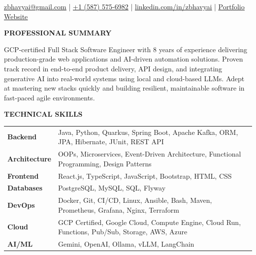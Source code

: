\documentclass[a4paper]{article}
\newcommand{\header} [1] {
    \vspace{6pt}
    {\hspace*{-18pt} \textcolor{Accent}{\large\textbf{\MakeUppercase{#1}}}}
    \vspace{-7pt} \\
    {\color{Accent}\hspace*{-18pt} \hrulefill \hspace*{-7pt}}
}
\begin{document}
\begin{center}
   {}
\end{center}
\vspace{-10pt}

\begin{center}
    \href{mailto:zbhavyai@gmail.com}{\uline{zbhavyai@gmail.com}} \quad|\quad
    \href{tel:+15875756982}{\uline{+1 (587) 575-6982}} \quad|\quad
    \href{https://linkedin.com/in/zbhavyai}{\uline{linkedin.com/in/zbhavyai}} \quad|\quad
    \href{https://zbhavyai.github.io}{\uline{Portfolio Website}}
\end{center}


\header{Professional Summary}

\vspace{-8pt}
\begin{justify}
{\fontsize{9.0pt}{11pt}\selectfont GCP-certified Full Stack Software Engineer with 8 years of experience delivering production-grade web applications and AI-driven automation solutions. Proven track record in end-to-end product delivery, API design, and integrating generative AI into real-world systems using local and cloud-based LLMs. Adept at mastering new stacks quickly and building resilient, maintainable software in fast-paced agile environments.}
\end{justify}
\vspace{-4pt}


\header{Technical Skills}

\vspace{2pt}
{\fontsize{9.0pt}{11pt}\selectfont
\begin{tabular}{ l l }
    \textbf{Backend}       & Java, Python, Quarkus, Spring Boot, Apache Kafka, ORM, JPA, Hibernate, JUnit, REST API             \\
    \textbf{Architecture}  & OOPs, Microservices, Event-Driven Architecture, Functional Programming, Design Patterns            \\
    \textbf{Frontend}      & React.js, TypeScript, JavaScript, Bootstrap, HTML, CSS                                             \\
    \textbf{Databases}     & PostgreSQL, MySQL, SQL, Flyway                                                                     \\
    \textbf{DevOps}        & Docker, Git, CI/CD, Linux, Ansible, Bash, Maven, Prometheus, Grafana, Nginx, Terraform             \\
    \textbf{Cloud}         & GCP Certified, Google Cloud, Compute Engine, Cloud Run, Functions, Pub/Sub, Storage, AWS, Azure    \\
    \textbf{AI/ML}         & Gemini, OpenAI, Ollama, vLLM, LangChain                                                            \\
\end{tabular}
}
\end{document}
